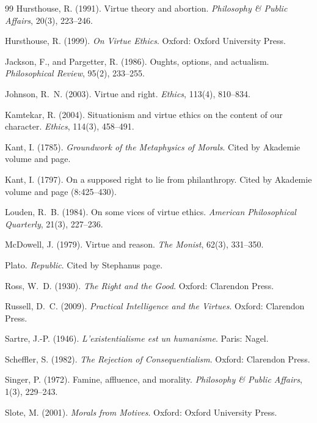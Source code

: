 \documentclass{situationist-preprint}
\begin{document}
\begin{thebibliography}{99}
 Hursthouse, R. (1991). Virtue theory and abortion. \emph{Philosophy \& Public Affairs}, 20(3), 223--246.

 Hursthouse, R. (1999). \emph{On Virtue Ethics}. Oxford: Oxford University Press.

 Jackson, F., and Pargetter, R. (1986). Oughts, options, and actualism. \emph{Philosophical Review}, 95(2), 233--255.

 Johnson, R.~N. (2003). Virtue and right. \emph{Ethics}, 113(4), 810--834.

 Kamtekar, R. (2004). Situationism and virtue ethics on the content of our character. \emph{Ethics}, 114(3), 458--491.

 Kant, I. (1785). \emph{Groundwork of the Metaphysics of Morals}. Cited by Akademie volume and page.

 Kant, I. (1797). On a supposed right to lie from philanthropy. Cited by Akademie volume and page (8:425--430).

 Louden, R.~B. (1984). On some vices of virtue ethics. \emph{American Philosophical Quarterly}, 21(3), 227--236.

 McDowell, J. (1979). Virtue and reason. \emph{The Monist}, 62(3), 331--350.

 Plato. \emph{Republic}. Cited by Stephanus page.

 Ross, W.~D. (1930). \emph{The Right and the Good}. Oxford: Clarendon Press.

 Russell, D.~C. (2009). \emph{Practical Intelligence and the Virtues}. Oxford: Clarendon Press.

 Sartre, J.-P. (1946). \emph{L'existentialisme est un humanisme}. Paris: Nagel.

 Scheffler, S. (1982). \emph{The Rejection of Consequentialism}. Oxford: Clarendon Press.

 Singer, P. (1972). Famine, affluence, and morality. \emph{Philosophy \& Public Affairs}, 1(3), 229--243.

 Slote, M. (2001). \emph{Morals from Motives}. Oxford: Oxford University Press.


\end{thebibliography}
\end{document}
